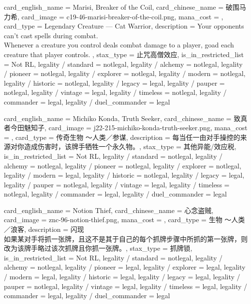 \documentclass[lang = cn, color = black, 10pt]{AllThatStax}
\begin{document}
\card
{
	card_english_name = {Marisi, Breaker of the Coil},
	card_chinese_name = {破围马力希},
	card_image = c19-46-marisi-breaker-of-the-coil.png,
	mana_cost = ,
	card_type = Legendary Creature — Cat Warrior,
	description = {Your opponents can't cast spells during combat.\\
		Whenever a creature you control deals combat damage to a player, goad each creature that player controls. },
	stax_type = 止咒高僧效应,
	is_in_restricted_list = Not RL,
	legality / standard = notlegal,
	legality / alchemy = notlegal,
	legality / pioneer = notlegal,
	legality / explorer = notlegal,
	legality / modern = notlegal,
	legality / historic = notlegal,
	legality / legacy = legal,
	legality / pauper = notlegal,
	legality / vintage = legal,
	legality / timeless = notlegal,
	legality / commander = legal,
	legality / duel_commander = legal
}

\card
{
	card_english_name = {Michiko Konda, Truth Seeker},
	card_chinese_name = {致真者今田魅知子},
	card_image = j22-215-michiko-konda-truth-seeker.png,
	mana_cost = ,
	card_type = 传奇生物 ～人类／参谋,
	description = {每当任一由对手操控的来源对你造成伤害时，该牌手牺牲一个永久物。},
	stax_type = 其他异能/效应税,
	is_in_restricted_list = Not RL,
	legality / standard = notlegal,
	legality / alchemy = notlegal,
	legality / pioneer = notlegal,
	legality / explorer = notlegal,
	legality / modern = legal,
	legality / historic = notlegal,
	legality / legacy = legal,
	legality / pauper = notlegal,
	legality / vintage = legal,
	legality / timeless = notlegal,
	legality / commander = legal,
	legality / duel_commander = legal
}

\card
{
	card_english_name = {Notion Thief},
	card_chinese_name = {心念盗贼},
	card_image = znc-96-notion-thief.png,
	mana_cost = ,
	card_type = 生物 ～人类／浪客,
	description = {闪现\\
		如果某对手将抓一张牌，且这不是其于自己的每个抓牌步骤中所抓的第一张牌，则改为该牌手略过该次抓牌且你抓一张牌。},
	stax_type = 抓牌锁,
	is_in_restricted_list = Not RL,
	legality / standard = notlegal,
	legality / alchemy = notlegal,
	legality / pioneer = legal,
	legality / explorer = legal,
	legality / modern = legal,
	legality / historic = legal,
	legality / legacy = legal,
	legality / pauper = notlegal,
	legality / vintage = legal,
	legality / timeless = legal,
	legality / commander = legal,
	legality / duel_commander = legal
}
\end{document}

